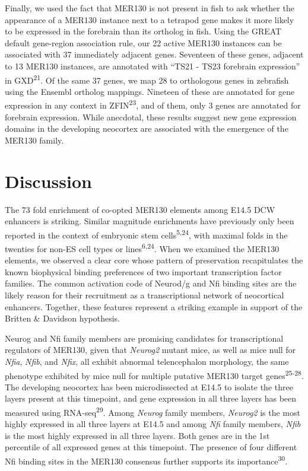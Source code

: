 \documentclass[]{article}
\begin{document}
Finally, we used the fact that MER130 is not present in fish to ask
whether the appearance of a MER130 instance next to a tetrapod gene
makes it more likely to be expressed in the forebrain than its ortholog
in fish. Using the GREAT default gene-region association rule, our 22
active MER130 instances can be associated with 37 immediately adjacent
genes. Seventeen of these genes, adjacent to 13 MER130 instances, are
annotated with ``TS21 - TS23 forebrain expression'' in
GXD\textsuperscript{21}. Of the same 37 genes, we map 28 to orthologous
genes in zebrafish using the Ensembl ortholog mappings. Nineteen of
these are annotated for gene expression in any context in
ZFIN\textsuperscript{23}, and of them, only 3 genes are annotated for
forebrain expression. While anecdotal, these results suggest new gene
expression domains in the developing neocortex are associated with the
emergence of the MER130 family.

\section{Discussion}\label{discussion}

The 73 fold enrichment of co-opted MER130 elements among E14.5 DCW
enhancers is striking. Similar magnitude enrichments have previously
only been reported in the context of embryonic stem
cells\textsuperscript{5,24}, with maximal folds in the twenties for
non-ES cell types or lines\textsuperscript{6,24}. When we examined the
MER130 elements, we observed a clear core whose pattern of preservation
recapitulates the known biophysical binding preferences of two important
transcription factor families. The common activation code of Neurod/g
and Nfi binding sites are the likely reason for their recruitment as a
transcriptional network of neocortical enhancers. Together, these
features represent a striking example in support of the Britten \&
Davidson hypothesis.

Neurog and Nfi family members are promising candidates for
transcriptional regulators of MER130, given that \emph{Neurog2} mutant
mice, as well as mice null for \emph{Nfia}, \emph{Nfib}, and
\emph{Nfix}, all exhibit abnormal telencephalon morphology, the same
phenotype exhibited by mice null for multiple putative MER130 target
genes\textsuperscript{25-28}. The developing neocortex has been
microdissected at E14.5 to isolate the three layers present at this
timepoint, and gene expression in all three layers has been measured
using RNA-seq\textsuperscript{29}. Among \emph{Neurog} family members,
\emph{Neurog2} is the most highly expressed in all three layers at E14.5
and among \emph{Nfi} family members, \emph{Nfib} is the most highly
expressed in all three layers. Both genes are in the 1st percentile of
all expressed genes at this timepoint. The presence of four different
Nfi binding sites in the MER130 consensus further supports its
importance\textsuperscript{30}.
\end{document}
